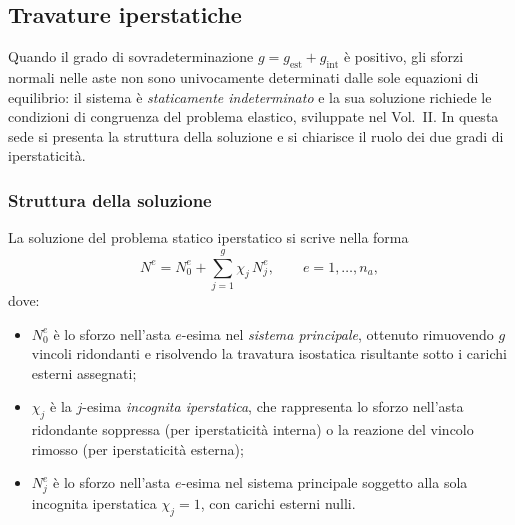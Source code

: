 \subsection{Travature iperstatiche}
\label{sec:reticolari_iperstat}

Quando il grado di sovradeterminazione $g = g_\text{est}
+ g_\text{int}$ è positivo, gli sforzi normali nelle
aste non sono univocamente determinati dalle sole
equazioni di equilibrio: il sistema è
\emph{staticamente indeterminato} e la sua soluzione
richiede le condizioni di congruenza del problema
elastico, sviluppate nel Vol.~II. In questa sede
si presenta la struttura della soluzione e si
chiarisce il ruolo dei due gradi di iperstaticità.

\subsubsection{Struttura della soluzione}
\label{subsec:iperstat_struttura}

La soluzione del problema statico iperstatico si
scrive nella forma
\begin{equation}\label{eq:sol_iperstatica}
	N^e = N^e_0 + \sum_{j=1}^{g} \chi_j\, N^e_j,
	\qquad e = 1, \ldots, n_a,
\end{equation}
dove:
\begin{itemize}[noitemsep]
	\item $N^e_0$ è lo sforzo nell'asta $e$-esima
	nel \emph{sistema principale}, ottenuto
	rimuovendo $g$ vincoli ridondanti e
	risolvendo la travatura isostatica risultante
	sotto i carichi esterni assegnati;
	\item $\chi_j$ è la $j$-esima \emph{incognita
		iperstatica}, che rappresenta lo sforzo
	nell'asta ridondante soppressa (per
	iperstaticità interna) o la reazione del
	vincolo rimosso (per iperstaticità esterna);
	\item $N^e_j$ è lo sforzo nell'asta $e$-esima
	nel sistema principale soggetto alla sola
	incognita iperstatica $\chi_j = 1$, con
	carichi esterni nulli.
\end{itemize}

